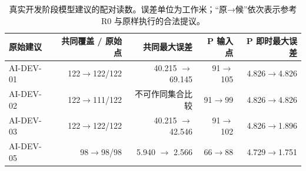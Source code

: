 \begin{table}[H]
\centering\small
\caption{真实开发阶段模型建议的配对读数。误差单位为工作米；“原→候”依次表示参考 R0 与原样执行的合法提议。}
\begin{tabular}{lrrrr}
\toprule 原始建议 & 共同覆盖 / 原始点 & 共同最大误差 & P 输入点 & P 即时最大误差 \\ \midrule
AI-DEV-01 & 122$\to$122/122 & 40.215 $\to$ 69.145 & 91$\to$105 & 4.826$\to$4.826 \\
AI-DEV-02 & 122$\to$111/122 & 不可作同集合比较 & 91$\to$99 & 4.826$\to$4.826 \\
AI-DEV-03 & 122$\to$122/122 & 40.215 $\to$ 42.546 & 91$\to$102 & 4.826$\to$1.896 \\
AI-DEV-05 & 98$\to$98/98 & 5.940 $\to$ 2.566 & 66$\to$88 & 4.729$\to$1.751 \\
\bottomrule\end{tabular}
\end{table}
